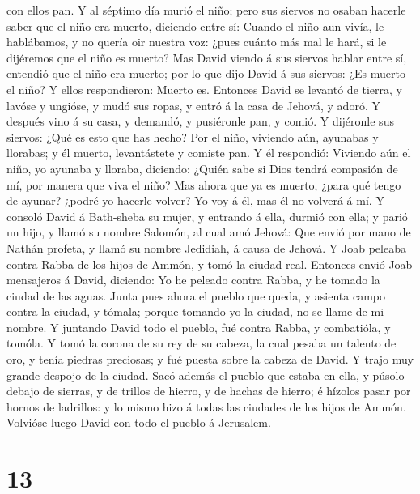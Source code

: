 con ellos pan.  Y al séptimo día murió el niño; pero sus
siervos no osaban hacerle saber que el niño era muerto, diciendo entre
sí: Cuando el niño aun vivía, le hablábamos, y no quería oir nuestra
voz: ¿pues cuánto más mal le hará, si le dijéremos que el niño es
muerto?  Mas David viendo á sus siervos hablar entre sí,
entendió que el niño era muerto; por lo que dijo David á sus siervos:
¿Es muerto el niño? Y ellos respondieron: Muerto es. 
Entonces David se levantó de tierra, y lavóse y ungióse, y mudó sus
ropas, y entró á la casa de Jehová, y adoró. Y después vino á su casa, y
demandó, y pusiéronle pan, y comió.  Y dijéronle sus
siervos: ¿Qué es esto que has hecho? Por el niño, viviendo aún, ayunabas
y llorabas; y él muerto, levantástete y comiste pan.  Y él
respondió: Viviendo aún el niño, yo ayunaba y lloraba, diciendo: ¿Quién
sabe si Dios tendrá compasión de mí, por manera que viva el niño?
 Mas ahora que ya es muerto, ¿para qué tengo de ayunar?
¿podré yo hacerle volver? Yo voy á él, mas él no volverá á mí.
 Y consoló David á Bath-sheba su mujer, y entrando á ella,
durmió con ella; y parió un hijo, y llamó su nombre Salomón, al cual amó
Jehová:  Que envió por mano de Nathán profeta, y llamó su
nombre Jedidiah, á causa de Jehová.  Y Joab peleaba contra
Rabba de los hijos de Ammón, y tomó la ciudad real. 
Entonces envió Joab mensajeros á David, diciendo: Yo he peleado contra
Rabba, y he tomado la ciudad de las aguas.  Junta pues
ahora el pueblo que queda, y asienta campo contra la ciudad, y tómala;
porque tomando yo la ciudad, no se llame de mi nombre.  Y
juntando David todo el pueblo, fué contra Rabba, y combatióla, y tomóla.
 Y tomó la corona de su rey de su cabeza, la cual pesaba un
talento de oro, y tenía piedras preciosas; y fué puesta sobre la cabeza
de David. Y trajo muy grande despojo de la ciudad.  Sacó
además el pueblo que estaba en ella, y púsolo debajo de sierras, y de
trillos de hierro, y de hachas de hierro; é hízolos pasar por hornos de
ladrillos: y lo mismo hizo á todas las ciudades de los hijos de Ammón.
Volvióse luego David con todo el pueblo á Jerusalem.

\hypertarget{section-12}{%
\section{13}\label{section-12}}

